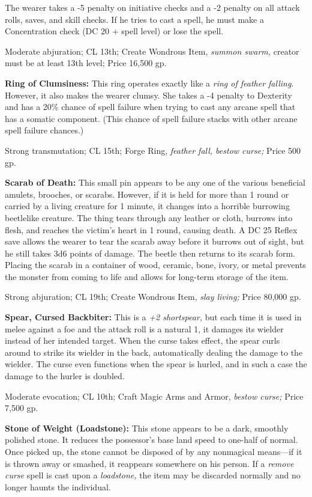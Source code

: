 The wearer takes a -5 penalty on initiative checks and a -2 penalty on all attack 
rolls, saves, and skill checks. If he tries to cast a spell, he must make a Concentration 
check (DC 20 + spell level) or lose the spell.

Moderate abjuration; CL 13th; Create Wondrous Item, \textit{summon swarm, }creator 
must be at least 13th level; Price 16,500 gp.

\textbf{Ring of Clumsiness:} This ring operates exactly like a \textit{ring of 
feather falling}. However, it also makes the wearer clumsy. She takes a -4 penalty 
to Dexterity and has a 20\% chance of spell failure when trying to cast any arcane 
spell that has a somatic component. (This chance of spell failure stacks with other 
arcane spell failure chances.)

Strong transmutation; CL 15th; Forge Ring, \textit{feather fall, bestow curse; 
}Price 500 gp.

\textbf{Scarab of Death: }This small pin appears to be any one of the various beneficial 
amulets, brooches, or scarabs. However, if it is held for more than 1 round or 
carried by a living creature for 1 minute, it changes into a horrible burrowing 
beetlelike creature. The thing tears through any leather or cloth, burrows into 
flesh, and reaches the victim's heart in 1 round, causing death. A DC 25 Reflex 
save allows the wearer to tear the scarab away before it burrows out of sight, 
but he still takes 3d6 points of damage. The beetle then returns to its scarab 
form. Placing the scarab in a container of wood, ceramic, bone, ivory, or metal 
prevents the monster from coming to life and allows for long-term storage of the 
item.

Strong abjuration; CL 19th; Create Wondrous Item, \textit{slay living; }Price 80,000 
gp.

\textbf{Spear, Cursed Backbiter:} This is a \textit{+2 shortspear, }but each time 
it is used in melee against a foe and the attack roll is a natural 1, it damages 
its wielder instead of her intended target. When the curse takes effect, the spear 
curls around to strike its wielder in the back, automatically dealing the damage 
to the wielder. The curse even functions when the spear is hurled, and in such 
a case the damage to the hurler is doubled.

Moderate evocation; CL 10th; Craft Magic Arms and Armor, \textit{bestow curse; 
}Price 7,500 gp.

\textbf{Stone of Weight (Loadstone):} This stone appears to be a dark, smoothly 
polished stone. It reduces the possessor's base land speed to one-half of normal. 
Once picked up, the stone cannot be disposed of by any nonmagical means---if it 
is thrown away or smashed, it reappears somewhere on his person. If a \textit{remove 
curse }spell is cast upon a \textit{loadstone, }the item may be discarded normally 
and no longer haunts the individual.

